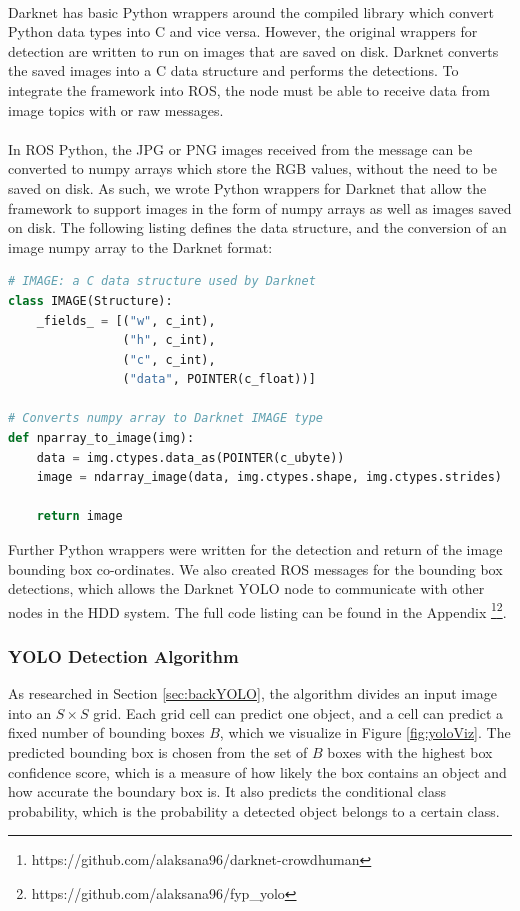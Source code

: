 \paragraph{}Darknet has basic Python wrappers around the compiled library which convert Python data types into C and vice versa. However, the original wrappers for detection are written to run on images that are saved on disk. Darknet converts the saved images into a C data structure  and performs the detections. To integrate the framework into ROS, the node must be able to receive data from image topics with  or raw  messages.

\paragraph{}In ROS Python, the JPG or PNG images received from the  message can be converted to numpy arrays which store the RGB values, without the need to be saved on disk. As such, we wrote Python wrappers for Darknet that allow the framework to support images in the form of numpy arrays as well as images saved on disk. The following listing defines the  data structure, and the conversion of an image numpy array to the Darknet format: \\

\begin{lstlisting}[language=Python, caption={Darknet IMAGE Python wrappers for seamless ROS integration.}]
# IMAGE: a C data structure used by Darknet
class IMAGE(Structure): 
	_fields_ = [("w", c_int),
				("h", c_int),
				("c", c_int),
				("data", POINTER(c_float))]
				
# Converts numpy array to Darknet IMAGE type
def nparray_to_image(img): 
	data = img.ctypes.data_as(POINTER(c_ubyte))
	image = ndarray_image(data, img.ctypes.shape, img.ctypes.strides)

	return image
\end{lstlisting}

Further Python wrappers were written for the detection and return of the image bounding box co-ordinates. We also created ROS messages for the bounding box detections, which allows the Darknet YOLO node to communicate with other nodes in the HDD system. The full code listing can be found in the Appendix \footnote{https://github.com/alaksana96/darknet-crowdhuman}\footnote{https://github.com/alaksana96/fyp\_yolo}.

\subsubsection{YOLO Detection Algorithm}
As researched in Section \ref{sec:backYOLO}, the algorithm divides an input image into an $S\times S$ grid. Each grid cell can predict one object, and a cell can predict a fixed number of bounding boxes $B$, which we visualize in Figure \ref{fig:yoloViz}. The predicted bounding box is chosen from the set of $B$ boxes with the highest box confidence score, which is a measure of how likely the box contains an object and how accurate the boundary box is. It also predicts the conditional class probability, which is the probability a detected object belongs to a certain class. 

